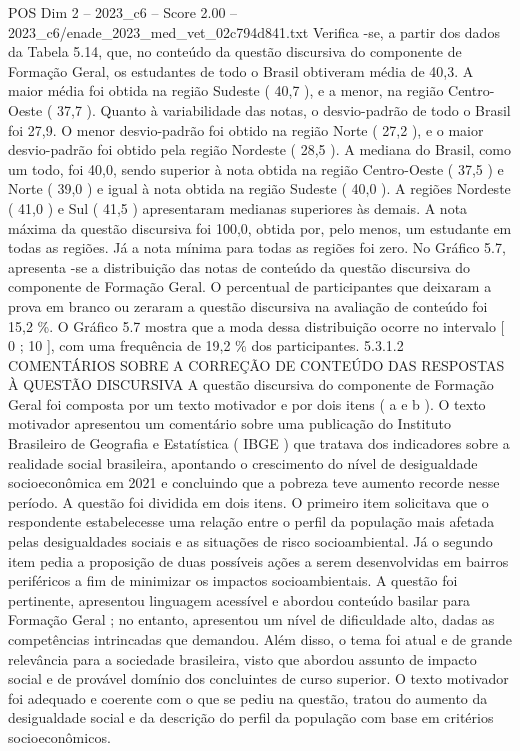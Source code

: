 \begin{textsample}{POS Dim 2 – 2023\_c6 – Score 2.00 – 2023\_c6/enade\_2023\_med\_vet\_02c794d841.txt}
Verifica -se, a partir dos dados da Tabela 5.14, que, no conteúdo da questão discursiva do componente de Formação Geral, os estudantes de todo o Brasil obtiveram média de 40,3.
A maior média foi obtida na região Sudeste ( 40,7 ), e a menor, na região Centro-Oeste ( 37,7 ).
Quanto à variabilidade das notas, o desvio-padrão de todo o Brasil foi 27,9.
O menor desvio-padrão foi obtido na região Norte ( 27,2 ), e o maior desvio-padrão foi obtido pela região Nordeste ( 28,5 ).
A mediana do Brasil, como um todo, foi 40,0, sendo superior à nota obtida na região Centro-Oeste ( 37,5 ) e Norte ( 39,0 ) e igual à nota obtida na região Sudeste ( 40,0 ).
A regiões Nordeste ( 41,0 ) e Sul ( 41,5 ) apresentaram medianas superiores às demais.
A nota máxima da questão discursiva foi 100,0, obtida por, pelo menos, um estudante em todas as regiões.
Já a nota mínima para todas as regiões foi zero.
No Gráfico 5.7, apresenta -se a distribuição das notas de conteúdo da questão discursiva do componente de Formação Geral.
O percentual de participantes que deixaram a prova em branco ou zeraram a questão discursiva na avaliação de conteúdo foi 15,2 \%.
O Gráfico 5.7 mostra que a moda dessa distribuição ocorre no intervalo [ 0 ; 10 ], com uma frequência de 19,2 \% dos participantes. 5.3.1.2 COMENTÁRIOS SOBRE A CORREÇÃO DE CONTEÚDO DAS RESPOSTAS À QUESTÃO DISCURSIVA A questão discursiva do componente de Formação Geral foi composta por um texto motivador e por dois itens ( a e b ).
O texto motivador apresentou um comentário sobre uma publicação do Instituto Brasileiro de Geografia e Estatística ( IBGE ) que tratava dos indicadores sobre a realidade social brasileira, apontando o crescimento do nível de desigualdade socioeconômica em 2021 e concluindo que a pobreza teve aumento recorde nesse período.
A questão foi dividida em dois itens.
O primeiro item solicitava que o respondente estabelecesse uma relação entre o perfil da população mais afetada pelas desigualdades sociais e as situações de risco socioambiental.
Já o segundo item pedia a proposição de duas possíveis ações a serem desenvolvidas em bairros periféricos a fim de minimizar os impactos socioambientais.
A questão foi pertinente, apresentou linguagem acessível e abordou conteúdo basilar para Formação Geral ; no entanto, apresentou um nível de dificuldade alto, dadas as competências intrincadas que demandou.
Além disso, o tema foi atual e de grande relevância para a sociedade brasileira, visto que abordou assunto de impacto social e de provável domínio dos concluintes de curso superior.
O texto motivador foi adequado e coerente com o que se pediu na questão, tratou do aumento da desigualdade social e da descrição do perfil da população com base em critérios socioeconômicos.

\end{textsample}
